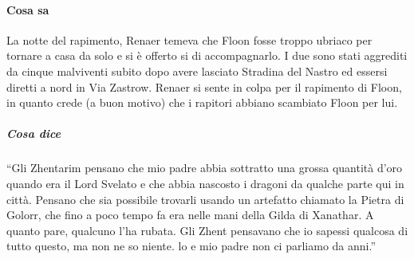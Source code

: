 \documentclass{article}
\begin{document}
\paragraph{Cosa sa}
La notte del rapimento, Renaer temeva che Floon fosse
troppo ubriaco per tornare a casa da solo e si è offerto si
di accompagnarlo. I due sono stati aggrediti da cinque
malviventi subito dopo avere lasciato Stradina del Nastro
ed essersi diretti a nord in Via Zastrow.
Renaer si sente in colpa per il rapimento di Floon,
in quanto crede (a buon motivo) che i rapitori abbiano
scambiato Floon per lui.


\subparagraph{Cosa dice }
“Gli Zhentarim pensano che mio padre abbia sottratto
una grossa quantità d'oro quando era il Lord Svelato
e che abbia nascosto i dragoni da qualche parte qui
in città. Pensano che sia possibile trovarli usando un
artefatto chiamato la Pietra di Golorr, che fino a poco
tempo fa era nelle mani della Gilda di Xanathar. A quanto
pare, qualcuno l'ha rubata. Gli Zhent pensavano che io
sapessi qualcosa di tutto questo, ma non ne so niente. lo
e mio padre non ci parliamo da anni.”
\end{document}
